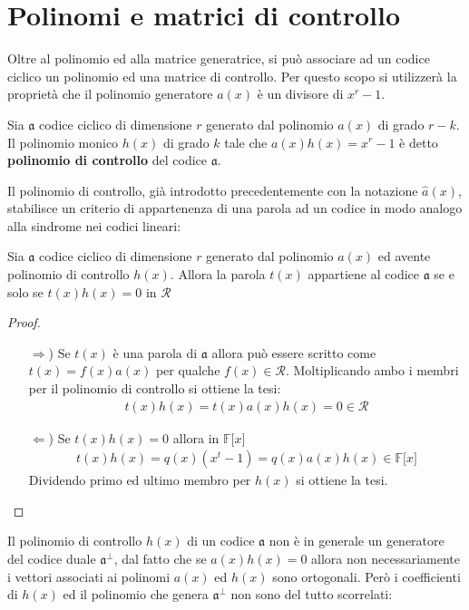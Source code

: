\section{Polinomi e matrici di controllo}
Oltre al polinomio ed alla matrice generatrice, si può associare ad un codice ciclico un polinomio ed una matrice di controllo. Per questo scopo si utilizzerà la proprietà che il polinomio generatore $a(x)$ è un divisore di $x^r - 1$.
\begin{definizione}
   Sia $\mathfrak{a}$ codice ciclico di dimensione $r$ generato dal polinomio $a(x)$ di grado $r-k$. Il polinomio monico $h(x)$ di grado $k$ tale che $a(x)h(x) = x^r - 1$ è detto {\bf polinomio di controllo} del codice $\mathfrak{a}$.
\end{definizione}
\noindent
Il polinomio di controllo, già introdotto precedentemente con la notazione $\hat{a}(x)$, stabilisce un criterio di appartenenza di una parola ad un codice in modo analogo alla sindrome nei codici lineari:
\begin{teorema}\label{teo:appartenenzaCiclica}
   Sia $\mathfrak{a}$ codice ciclico di dimensione $r$ generato dal polinomio $a(x)$ ed avente polinomio di controllo $h(x)$. Allora la parola $t(x)$ appartiene al codice $\mathfrak{a}$ se e solo se $t(x)h(x) = 0$ in $\mathcal{R}$
\end{teorema}
\begin{proof}
   \begin{itemize}
   \item[$\Rightarrow$)] Se $t(x)$ è una parola di $\mathfrak{a}$ allora può essere scritto come $t(x) = f(x)a(x)$ per qualche $f(x) \in \mathcal{R}$. Moltiplicando ambo i membri per il polinomio di controllo si ottiene la tesi:
   \begin{align*}
     t(x)h(x) = t(x)a(x)h(x) = 0 \in \mathcal{R} 
   \end{align*}
   \item[$\Leftarrow$)] Se $t(x)h(x) = 0$ allora in $\mathbb{F} \lbrack x \rbrack $ 
   \begin{align*}
     t(x)h(x) = q(x)(x^t - 1) =  q(x)a(x)h(x) \in \mathbb{F} \lbrack x \rbrack
   \end{align*}
   Dividendo primo ed ultimo membro per $h(x)$ si ottiene la tesi.
\end{itemize}
\end{proof}
\noindent
Il polinomio di controllo $h(x)$ di un codice $\mathfrak{a}$ non è in generale un generatore del codice duale $\mathfrak{a}^{\perp}$, dal fatto che se $a(x)h(x) = 0$ allora non necessariamente i vettori associati ai polinomi $a(x)$ ed $h(x)$ sono ortogonali. Però i coefficienti di $h(x)$ ed il polinomio che genera $\mathfrak{a}^{\perp}$ non sono del tutto scorrelati:
